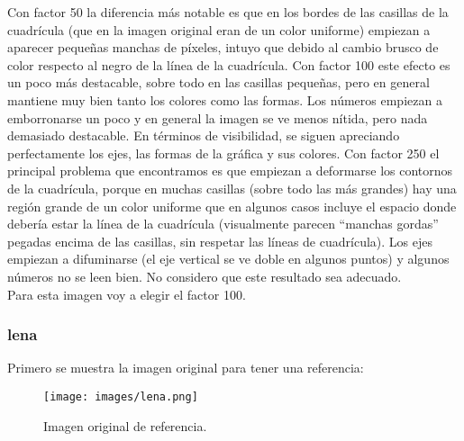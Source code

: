 \documentclass[12pt,a4paper]{article}
\begin{document}
Con factor 50 la diferencia más notable es que en los bordes de las casillas de la cuadrícula (que en la imagen original eran de un color uniforme) empiezan a aparecer pequeñas manchas de píxeles, intuyo que debido al cambio brusco de color respecto al negro de la línea de la cuadrícula. Con factor 100 este efecto es un poco más destacable, sobre todo en las casillas pequeñas, pero en general mantiene muy bien tanto los colores como las formas. Los números empiezan a emborronarse un poco y en general la imagen se ve menos nítida, pero nada demasiado destacable. En términos de visibilidad, se siguen apreciando perfectamente los ejes, las formas de la gráfica y sus colores. Con factor 250 el principal problema que encontramos es que empiezan a deformarse los contornos de la cuadrícula, porque en muchas casillas (sobre todo las más grandes) hay una región grande de un color uniforme que en algunos casos incluye el espacio donde debería estar la línea de la cuadrícula (visualmente parecen ``manchas gordas'' pegadas encima de las casillas, sin respetar las líneas de cuadrícula). Los ejes empiezan a difuminarse (el eje vertical se ve doble en algunos puntos) y algunos números no se leen bien. No considero que este resultado sea adecuado.\\

Para esta imagen voy a elegir el factor 100.\\


\subsubsection{lena}
Primero se muestra la imagen original para tener una referencia:
\begin{figure}[H]
    \centering
    \texttt{[image: images/lena.png]}
    \caption[Referencia - lena]{Imagen original de referencia.}
    
\end{figure}
    
    \vspace{0.5cm}
    
\end{document}
